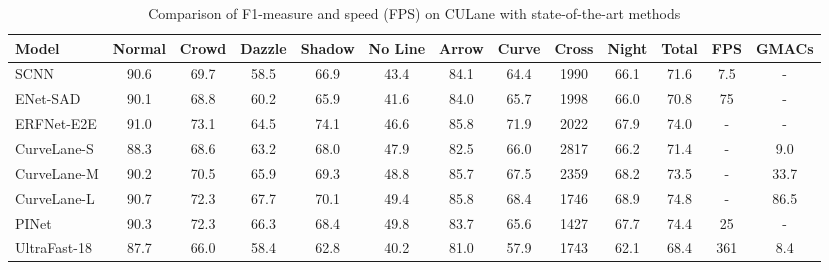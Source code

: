 \documentclass[conference]{IEEEtran}
\begin{document}
\begin{table*}[t]
\addtolength{\tabcolsep}{-2.5pt}
\begin{center}
\caption{Comparison of F1-measure and speed (FPS) on CULane with state-of-the-art methods}
\label{ta:results}


 \normalsize 
\begin{tabular}{|@{}l|c|c|c|c|c|c|c|c|c|c|c|@{}c|}
\hline
 \textbf{Model}                     & \textbf{Normal} & \textbf{Crowd} & \textbf{Dazzle} & \textbf{Shadow} & \textbf{No Line} & \textbf{Arrow} & \textbf{Curve} & \textbf{Cross} & \textbf{Night} & \textbf{Total} & \textbf{FPS} & \textbf{GMACs}\\ \hline
 SCNN\cite{pan2018SCNN}             & 90.6          & 69.7          & 58.5          & 66.9          & 43.4          & 84.1          & 64.4          & 1990          & 66.1          & 71.6          & 7.5   & - \\
 \hline
  ENet-SAD\cite{hou2019learning}    & 90.1          & 68.8          & 60.2          & 65.9          & 41.6          & 84.0          & 65.7          & 1998          & 66.0          & 70.8          & 75    & -\\
  \hline
 ERFNet-E2E \cite{yoo2020end}       & 91.0          & 73.1          & 64.5          & 74.1          & 46.6          & 85.8          & 71.9          & 2022          & 67.9          & 74.0          & -     & -\\
\hline
 CurveLane-S\cite{CurveLane-NAS}    & 88.3          & 68.6          & 63.2          & 68.0          & 47.9          & 82.5          & 66.0          & 2817          & 66.2          & 71.4          & -     & 9.0 \\
 CurveLane-M\cite{CurveLane-NAS}    & 90.2          & 70.5          & 65.9          & 69.3          & 48.8          & 85.7          & 67.5          & 2359          & 68.2          & 73.5          & -     & 33.7 \\
 CurveLane-L\cite{CurveLane-NAS}    & 90.7          & 72.3          & 67.7          & 70.1          & 49.4          & 85.8          & 68.4          & 1746          & 68.9          & 74.8          & -     & 86.5 \\
 \hline
  PINet \cite{pinet_2021}             & 90.3          & 72.3          & 66.3          & 68.4          & 49.8          & 83.7          & 65.6          & 1427          & 67.7          & 74.4          & 25    & - \\
 \hline
 UltraFast-18\cite{qin2020ultra}    & 87.7          & 66.0          & 58.4          & 62.8          & 40.2          & 81.0          & 57.9          & 1743          & 62.1          & 68.4          & 361   & 8.4\\

\end{tabular}
\end{center}
\end{table*}
\end{document}
